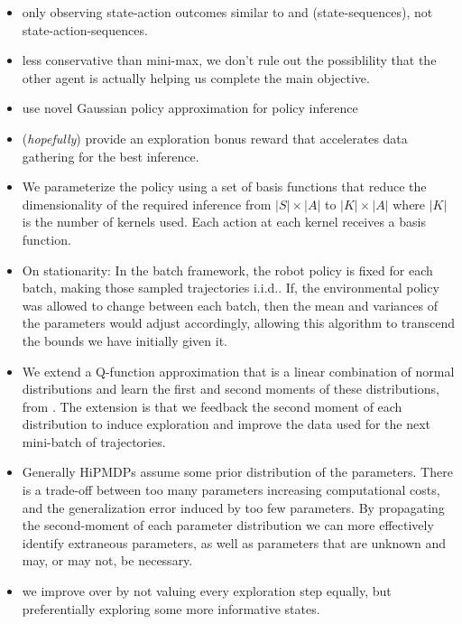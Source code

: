     \begin{itemize}
        \item only observing state-action outcomes similar to \cite{renato} and \cite{lim2013reinforcement}
            (state-sequences), not state-action-sequences.

        \item less conservative than mini-max, we don't rule out the possiblility that the other agent is actually
            helping us complete the main objective.
        \item use novel Gaussian policy approximation for policy inference
        \item (\textit{hopefully}) provide an exploration bonus reward that accelerates data gathering for the best
            inference.
        \item We parameterize the policy using a set of basis functions that reduce the dimensionality of the required
            inference from $|S|\times|A|$ to $|K|\times|A|$ where $|K|$ is the number of kernels used. Each action at
            each kernel receives a basis function.
        \item On stationarity: In the batch framework, the robot policy is fixed for each batch, making those sampled
            trajectories i.i.d.. If, the environmental policy was allowed to change between each batch, then the mean
            and variances of the parameters would adjust accordingly, allowing this algorithm to transcend the bounds we
            have initially given it.

        \item We extend a Q-function approximation that is a linear combination of normal distributions and learn the
            first and second moments of these distributions, from \cite{tangkaratt2014model}. The extension is that we
            feedback the second moment of each distribution to induce exploration and improve the data used for the next
            mini-batch of trajectories.
         \item Generally \ac{HiPMDP}s assume some prior distribution of the parameters. There is a trade-off between too many parameters increasing computational costs, and the generalization error induced by too few parameters. By propagating the second-moment of each parameter distribution we can more effectively identify extraneous parameters, as well as parameters that are unknown and may, or may not, be necessary.
         \item we improve over \Rmax by not valuing every exploration step equally, but preferentially exploring some more informative states.


\end{itemize}

